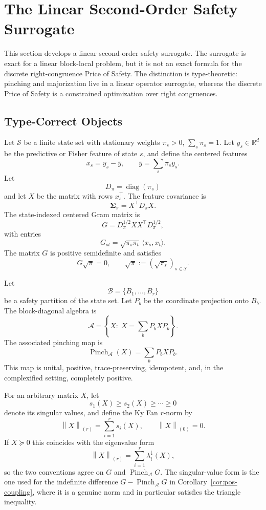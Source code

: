 \documentclass[12pt]{article}
\theoremstyle{definition}
\newcommand{\EA}{\operatorname{Pinch}_{\mathcal A}}
\newcommand{\KyF}[2]{\left\|#1\right\|_{(#2)}}
\begin{document}
\section{The Linear Second-Order Safety Surrogate}
\label{sec:pos-linear}

This section develops a linear second-order safety surrogate.  The surrogate
is exact for a linear block-local problem, but it is not an exact formula for
the discrete right-congruence Price of Safety.  The distinction is
type-theoretic: pinching and majorization live in a linear operator surrogate,
whereas the discrete Price of Safety is a constrained optimization over right
congruences.

\subsection{Type-Correct Objects}
\label{subsec:pos-objects}

Let $\mathcal S$ be a finite state set with stationary weights
$\pi_s>0$, $\sum_s\pi_s=1$.  Let $y_s\in\mathbb R^d$ be the predictive or
Fisher feature of state $s$, and define the centered features
\[
x_s=y_s-\bar y,
\qquad
\bar y=\sum_s\pi_s y_s.
\]
Let
\[
D_\pi=\operatorname{diag}(\pi_s)
\]
and let $X$ be the matrix with rows $x_s^\top$.  The feature covariance is
\[
\bm{\Sigma}_\pi
=
X^\top D_\pi X.
\]
The state-indexed centered Gram matrix is
\[
G
=
D_\pi^{1/2}XX^\top D_\pi^{1/2},
\]
with entries
\[
G_{st}
=
\sqrt{\pi_s\pi_t}\,
\langle x_s,x_t\rangle.
\]
The matrix $G$ is positive semidefinite and satisfies
\[
G\sqrt{\pi}=0,
\qquad
\sqrt{\pi}:=(\sqrt{\pi_s})_{s\in\mathcal S}.
\]

Let
\[
\mathcal B=\{B_1,\dots,B_r\}
\]
be a safety partition of the state set.  Let $P_b$ be the coordinate projection
onto $B_b$.  The block-diagonal algebra is
\[
\mathcal A
=
\left\{
X:\;X=\sum_b P_bXP_b
\right\}.
\]
The associated pinching map is
\[
\EA(X)
=
\sum_b P_bXP_b.
\]
This map is unital, positive, trace-preserving, idempotent, and, in the
complexified setting, completely positive.

For an arbitrary matrix $X$, let
\[
s_1(X)\ge s_2(X)\ge\cdots\ge0
\]
denote its singular values, and define the Ky Fan $r$-norm by
\[
\KyF{X}{r}
=
\sum_{i=1}^r
s_i(X),
\qquad
\KyF{X}{0}=0.
\]
If $X\succeq0$ this coincides with the eigenvalue form
\[
\KyF{X}{r}
=
\sum_{i=1}^r
\lambda_i^\downarrow(X),
\]
so the two conventions agree on $G$ and $\EA G$.  The singular-value form is
the one used for the indefinite difference $G-\EA G$ in
Corollary~\ref{cor:pos-coupling}, where it is a genuine norm and in
particular satisfies the triangle inequality.
\end{document}
